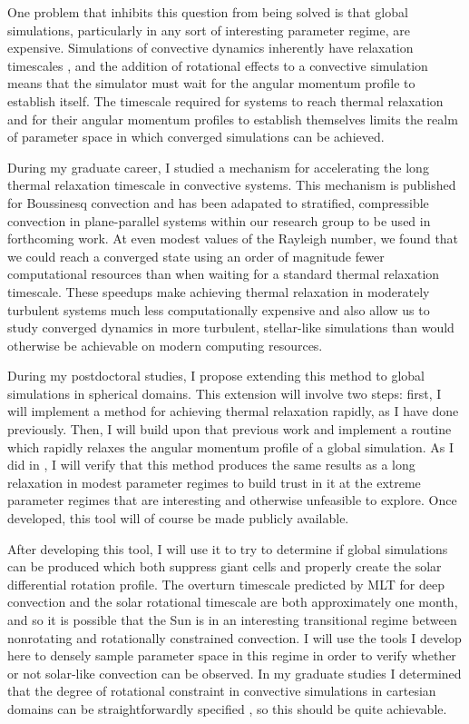 \documentclass[aasms,12pt]{article}
\begin{document}
One problem that inhibits this question from being solved is that global simulations, particularly in any sort of interesting parameter regime, are expensive.
Simulations of convective dynamics inherently have relaxation timescales \citep{anders&all2018}, and the addition of rotational effects to a convective simulation means that the simulator must wait for the angular momentum profile to establish itself.
The timescale required for systems to reach thermal relaxation and for their angular momentum profiles to establish themselves limits the realm of parameter space in which converged simulations can be achieved.

During my graduate career, I studied a mechanism for accelerating the long thermal relaxation timescale in convective systems.
This mechanism is published for Boussinesq convection \citep{anders&all2018} and has been adapated to stratified, compressible convection in plane-parallel systems within our research group to be used in forthcoming work.
At even modest values of the Rayleigh number, we found that we could reach a converged state using an order of magnitude fewer computational resources than when waiting for a standard thermal relaxation timescale.
These speedups make achieving thermal relaxation in moderately turbulent systems much less computationally expensive and also allow us to study converged dynamics in more turbulent, stellar-like simulations than would otherwise be achievable on modern computing resources.

During my postdoctoral studies, I propose extending this method to global simulations in spherical domains.
This extension will involve two steps: first, I will implement a method for achieving thermal relaxation rapidly, as I have done previously.
Then, I will build upon that previous work and implement a routine which rapidly relaxes the angular momentum profile of a global simulation.
As I did in \citet{anders&all2018}, I will verify that this method produces the same results as a long relaxation in modest parameter regimes to build trust in it at the extreme parameter regimes that are interesting and otherwise unfeasible to explore.
Once developed, this tool will of course be made publicly available.

After developing this tool, I will use it to try to determine if global simulations can be produced which both suppress giant cells and properly create the solar differential rotation profile.
The overturn timescale predicted by MLT for deep convection and the solar rotational timescale are both approximately one month, and so it is possible that the Sun is in an interesting transitional regime between nonrotating and rotationally constrained convection.
I will use the tools I develop here to densely sample parameter space in this regime in order to verify whether or not solar-like convection can be observed.
In my graduate studies I determined that the degree of rotational constraint in convective simulations in cartesian domains can be straightforwardly specified \citep{anders&all2019}, so this should be quite achievable.
\end{document}
